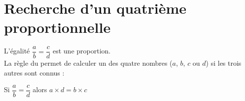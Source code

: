\documentclass[12pt,a4paper]{article}
\begin{document}
\section{Recherche d'un quatrième proportionnelle}

\begin{mymeth}
	L'égalité $\dfrac{a}{b}=\dfrac{c}{d}$ est une proportion.\\
	
	La règle du  permet de calculer un des quatre nombres ($a$, $b$, $c$ ou $d$) si les trois autres sont connus :
	
	\begin{center}
		Si $\dfrac{a}{b} = \dfrac{c}{d}$ alors $a \times d = b \times c$
	\end{center}
\end{mymeth}


\end{document}
